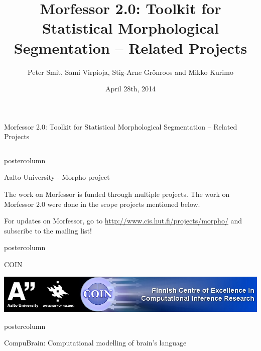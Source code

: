 \documentclass[final]{beamer} %
\title{Morfessor 2.0: Toolkit for Statistical Morphological Segmentation -- Related Projects}
\author{Peter Smit, Sami Virpioja, Stig-Arne Gr\"onroos and Mikko Kurimo}
\institute[Aalto University]{Aalto University}
\date{April 28th, 2014}
\newcommand{\collspace}{\vspace{6mm}}
\begin{document}
  \begin{frame}{Morfessor 2.0: Toolkit for Statistical Morphological Segmentation -- Related Projects} 
\begin{columns}



\begin{column}{.49\textwidth}
  \begin{beamercolorbox}[center,wd=\textwidth]{postercolumn}
 \begin{block}{Aalto University  - Morpho project}

The work on Morfessor is funded through multiple projects. The work on Morfessor 2.0 were done in the scope projects mentioned below.

For updates on Morfessor, go to  \url{http://www.cis.hut.fi/projects/morpho/}  and subscribe to the mailing list!

%


            \end{block}
            
	\end{beamercolorbox}
\vfill
\collspace

  \begin{beamercolorbox}[center,wd=\textwidth]{postercolumn}
 \begin{block}{COIN}
\vspace{1cm}

              \includegraphics[width=\textwidth]{coinbanner}            
            \end{block}
            
	\end{beamercolorbox}
\vfill

\collspace
  \begin{beamercolorbox}[center,wd=\textwidth]{postercolumn}
 \begin{block}{CompuBrain: Computational modelling of brain's language}



\end{block}
\end{beamercolorbox}
\end{column}
\end{columns}
\end{frame}
\end{document}
